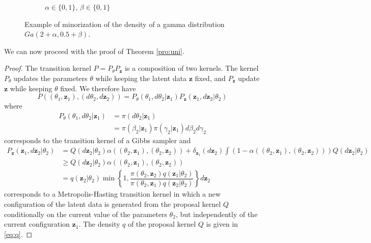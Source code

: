 \documentclass[12pt]{article}
\begin{document}
\begin{figure}
\begin{center}
\begin{subfigure}[b]{0.32\textwidth}
				\caption{$\alpha \in \{0,1\}$, $\beta \in \{0,1\}$}
				\label{fig:gam2}
			\end{subfigure}
		\end{center}
		\caption{Example of minorization of the density of a gamma distribution $Ga(2+\alpha, 0.5+\beta)$.
			\label{fig:gam}}
	\end{figure}
	
	We can now proceed with the proof of Theorem \ref{pro:uni}.
	
	\begin{proof}
		The transition kernel $P = P_{\theta} P_{\mathbf{z}}$ is a composition of two kernels. The kernel $P_{\theta}$ updates the parameters $\theta$ while keeping the latent data $\mathbf{z}$ fixed, and $P_{\mathbf{z}}$ update $\mathbf{z}$ while keeping $\theta$ fixed. %
		We therefore have
		$$P((\theta_1, \mathbf{z}_1), (d\theta_2, d\mathbf{z}_2)) = P_\theta(\theta_1, d\theta_2 | \mathbf{z}_1) P_\mathbf{z}(\mathbf{z}_1, d\mathbf{z}_2 | \theta_2)$$
		where
		\begin{align}
			\label{eq:Pth}
			P_\theta(\theta_1, d\theta_2 | \mathbf{z}_1)
			& = \pi(d\theta_2 | \mathbf{z}_1) \\
			& = \pi(\beta_2 | \mathbf{z}_1) \pi(\gamma_2 | \mathbf{z}_1) d\beta_2 d\gamma_2 \nonumber
		\end{align}
		corresponds to the transition kernel of a Gibbs sampler and
		\begin{align}
			\label{eq:Pz}
			P_\mathbf{z}(\mathbf{z}_1, d\mathbf{z}_2 | \theta_2)
			& = Q(d\mathbf{z}_2 | \theta_2) \alpha((\theta_2, \mathbf{z}_1),(\theta_2, \mathbf{z}_2)) + \delta_{\mathbf{z}_1}(d\mathbf{z}_2)\int(1-\alpha((\theta_2, \mathbf{z}_1),(\theta_2, \mathbf{z}_2))) Q(d\mathbf{z}_2| \theta_2) \nonumber \\
			& \ge Q(d\mathbf{z}_2| \theta_2) \alpha((\theta_2, \mathbf{z}_1),(\theta_2, \mathbf{z}_2)) \\
			& = q(\mathbf{z}_2| \theta_2) \min\left\lbrace 1, \dfrac{\pi(\theta_2, \mathbf{z}_2)q(\mathbf{z}_1| \theta_2)}{\pi(\theta_2, \mathbf{z}_1)q(\mathbf{z}_2| \theta_2)} \right\rbrace d\mathbf{z}_2 \nonumber
		\end{align}
		corresponds to a Metropolis-Hasting transition kernel in which a new configuration of the latent data is generated from the proposal kernel $Q$ conditionally on the current value of the parameters $\theta_2$, but independently of the current configuration $\mathbf{z}_1$. The density $q$ of the proposal kernel $Q$ is given in \eqref{eq:q}.
		

\end{proof}
\end{document}
